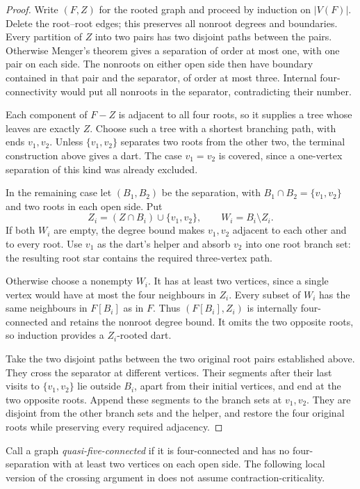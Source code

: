 \begin{proof}
Write $(F,Z)$ for the rooted graph and proceed by induction on $|V(F)|$.
Delete the root--root edges; this preserves all nonroot degrees and
boundaries.
Every partition of $Z$ into two pairs has two disjoint paths between
the pairs. Otherwise Menger's theorem gives a separation of order at
most one, with one pair on each side. The nonroots on either open side
then have boundary contained in that pair and the separator, of order
at most three. Internal four-connectivity would put all nonroots in
the separator, contradicting their number.

Each component of $F-Z$ is adjacent to all four roots, so it supplies a
tree whose leaves are exactly $Z$. Choose such a tree with a shortest
branching path, with ends $v_1,v_2$. Unless $\{v_1,v_2\}$ separates
two roots from the other two, the terminal construction above gives a
dart. The case $v_1=v_2$ is covered, since a one-vertex separation of
this kind was already excluded.

In the remaining case let $(B_1,B_2)$ be the separation, with
$B_1\cap B_2=\{v_1,v_2\}$ and two roots in each open side. Put
\[
 Z_i=(Z\cap B_i)\cup\{v_1,v_2\},\qquad W_i=B_i\setminus Z_i.
\]
If both $W_i$ are empty, the degree bound makes $v_1,v_2$ adjacent to
each other and to every root. Use $v_1$ as the dart's helper and absorb
$v_2$ into one root branch set: the resulting root star contains the
required three-vertex path.

Otherwise choose a nonempty $W_i$. It has at least two vertices, since
a single vertex would have at most the four neighbours in $Z_i$.
Every subset of $W_i$ has the same neighbours in $F[B_i]$ as in $F$.
Thus $(F[B_i],Z_i)$ is internally four-connected and retains the
nonroot degree bound. It omits the two opposite roots, so induction
provides a $Z_i$-rooted dart.

Take the two disjoint paths between the two original root pairs
established above. They cross the separator at different vertices.
Their segments after their last visits to $\{v_1,v_2\}$ lie outside
$B_i$, apart from their initial vertices, and end at the two opposite
roots. Append these segments to the branch sets at $v_1,v_2$. They are
disjoint from the other branch sets and the helper, and restore the four
original roots while preserving every required adjacency.
\end{proof}

Call a graph \emph{quasi-five-connected} if it is four-connected and has
no four-separation with at least two vertices on each open side. The
following local version of the crossing argument in
\cite[Lemma~1]{Kou2025} does not assume contraction-criticality.

